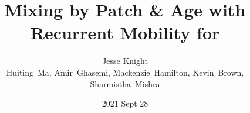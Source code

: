 \title{Mixing by Patch \& Age with Recurrent Mobility for \Covid}
\author[\color{gray}{\texttt{github.com/mishra-lab/mobile-patch-mixing}}]{
  Jesse Knight\\[\smallskipamount]
  Huiting~Ma, Amir~Ghasemi, Mackenzie~Hamilton, Kevin~Brown, Sharmistha~Mishra
}
\date{2021 Sept 28}
